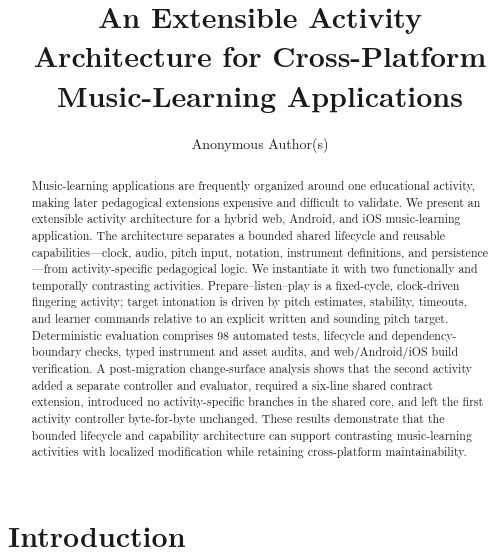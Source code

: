 \documentclass[runningheads]{llncs}
\begin{document}
%
\title{An Extensible Activity Architecture for Cross-Platform Music-Learning Applications}
%
%
\author{Anonymous Author(s)}
%
%
%
\maketitle              %
%
\begin{abstract}
Music-learning applications are frequently organized around one educational
activity, making later pedagogical extensions expensive and difficult to
validate. We present an extensible activity architecture for a hybrid
web, Android, and iOS music-learning application. The architecture separates a
bounded shared lifecycle and reusable capabilities---clock, audio, pitch input,
notation, instrument definitions, and persistence---from activity-specific
pedagogical logic. We instantiate it with two functionally and temporally
contrasting activities. Prepare--listen--play is a fixed-cycle, clock-driven
fingering activity; target intonation is driven by pitch estimates, stability,
timeouts, and learner commands relative to an explicit written and sounding
pitch target. Deterministic evaluation comprises 98 automated tests, lifecycle
and dependency-boundary checks, typed instrument and asset audits, and
web/Android/iOS build verification. A post-migration change-surface analysis
shows that the second activity added a separate controller and evaluator,
required a six-line shared contract extension, introduced no
activity-specific branches in the shared core, and left the first activity
controller byte-for-byte unchanged. These results demonstrate that the bounded
lifecycle and capability architecture can support contrasting music-learning
activities with localized modification while retaining cross-platform
maintainability.

\end{abstract}
%
%
%
\section{Introduction}\label{sec:introduction}
\end{document}

